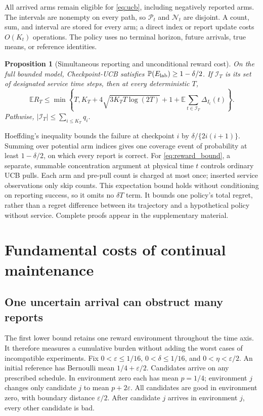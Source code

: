 \documentclass[11pt]{article}
\newtheorem{proposition}[theorem]{Proposition}
\theoremstyle{remark}
\newcommand{\E}{\mathbb E}
\newcommand{\Prob}{\mathbb P}
\newcommand{\suppproof}{Complete proofs appear in the supplementary material.}
\begin{document}
All arrived arms remain eligible for \eqref{eq:ucb}, including negatively
reported arms. The intervals are nonempty on every path, so
$\mathcal P_t$ and $\mathcal N_t$ are disjoint. A count, sum, and interval
are stored for every arm; a direct index or report update costs $O(K_t)$
operations. The policy uses no terminal horizon, future arrivals, true means,
or reference identities.

\begin{proposition}[Simultaneous reporting and unconditional reward cost]
\label{prop:reporting}
On the full bounded model, Checkpoint-UCB satisfies
$\Prob(E_{\rm lab})\ge1-\delta/2$. If $\mathcal I_T$ is its set of designated
service time steps, then at every deterministic $T$,
\begin{equation}
 \E R_T\le\min\left\{T,K_T+4\sqrt{3K_TT\log(2T)}+1+
                \E\sum_{t\in\mathcal I_T}\Delta_{I_t}(t)\right\}.
 \label{eq:reward_bound}
\end{equation}
Pathwise, $|\mathcal I_T|\le\sum_{i\le K_T}q_i$.
\end{proposition}

Hoeffding's inequality bounds the failure at checkpoint $i$ by
$\delta/\{2i(i+1)\}$. Summing over potential arm indices gives one coverage
event of probability at least $1-\delta/2$, on which every report is correct.
For \eqref{eq:reward_bound}, a separate, summable concentration argument at
physical time $t$ controls ordinary UCB pulls. Each arm and pre-pull count
is charged at most once; inserted service observations only skip counts.
This expectation bound holds without conditioning on reporting success,
so it omits no $\delta T$ term. It bounds one policy's total regret, rather
than a regret difference between its trajectory and a hypothetical policy
without service. \suppproof

\section{Fundamental costs of continual maintenance}
\label{sec:maintenance}

\subsection{One uncertain arrival can obstruct many reports}

The first lower bound retains one reward environment throughout the time axis.
It therefore measures a cumulative burden without adding the worst cases of
incompatible experiments. Fix
$0<\varepsilon\le1/16$, $0<\delta\le1/16$, and $0<\eta<\varepsilon/2$.
An initial reference has Bernoulli mean $1/4+\varepsilon/2$. Candidates arrive
on any prescribed schedule. In environment zero each has mean $p=1/4$;
environment $j$ changes only candidate $j$ to mean $p+2\varepsilon$.
All candidates are good in environment zero, with boundary distance
$\varepsilon/2$. After candidate $j$ arrives in environment $j$, every other
candidate is bad.
\end{document}
